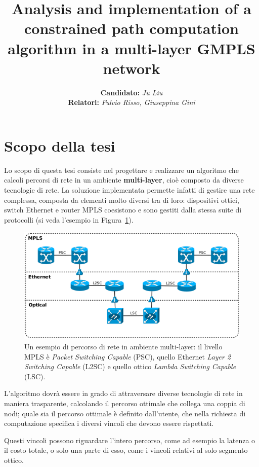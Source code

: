 \documentclass[10pt,a4paper]{article}
\author{\textbf{Candidato: }\textit{Ju Liu}\\\textbf{Relatori:
  }\textit{Fulvio Risso, Giuseppina Gini}}
\title{Analysis and implementation of a constrained path
    computation algorithm in a multi-layer GMPLS network}
\begin{document}
\maketitle

\section*{Scopo della tesi}

Lo scopo di questa tesi consiste nel progettare e realizzare un
algoritmo che calcoli percorsi di rete in un ambiente \textbf{multi-layer},
cioè composto da diverse tecnologie di rete. La soluzione
implementata permette infatti di gestire una rete complessa, composta
da elementi molto diversi tra di loro: dispositivi ottici, switch
Ethernet e router MPLS coesistono e sono gestiti dalla stessa suite di
protocolli (si veda l'esempio in Figura~\ref{fig:multi_path}).

\begin{figure}[!htbp]
  \begin{center}
    \includegraphics[width=1\textwidth]{img/multi_path}
    \caption[]{Un esempio di percorso di rete in ambiente multi-layer:
      il livello MPLS è \textit{Packet Switching Capable} (PSC),
      quello Ethernet \textit{Layer 2 Switching Capable} (L2SC) e
      quello ottico \textit{Lambda Switching Capable} (LSC).}
    \label{fig:multi_path}
  \end{center}
\end{figure}

L'algoritmo dovrà essere in grado di attraversare diverse tecnologie
di rete in maniera trasparente, calcolando il percorso ottimale che
collega una coppia di nodi; quale sia il percorso ottimale è definito
dall'utente, che nella richiesta di computazione specifica i diversi
vincoli che devono essere rispettati.

Questi vincoli possono riguardare l'intero percorso, come ad esempio
la latenza o il costo totale, o solo una parte di esso, come i vincoli
relativi al solo segmento ottico.
\end{document}
